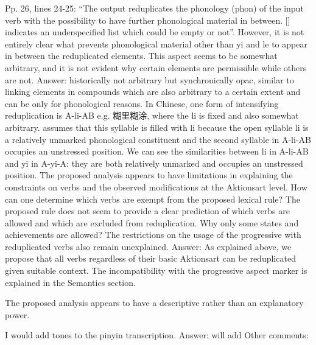 \documentclass[fleqn,twoside]{article}
\begin{document}
{%
Pp. 26, lines 24-25: “The output reduplicates the phonology (phon) of the input verb with the possibility to have further phonological material in between. [] indicates an underspecified list which could be empty or not”. However, it is not entirely clear what prevents phonological material other than yi and le to appear in between the reduplicated elements. This aspect seems to be somewhat arbitrary, and it is not evident why certain elements are permissible while others are not.
Answer:
historically not arbitrary but synchronically opac, similar to linking elements in compounds which are also arbitrary to a certain extent and can be only for phonological reasons.
In Chinese, one form of intensifying reduplication is A-li-AB e.g. 糊里糊涂, where the li is fixed and also somewhat arbitrary. 
\citet[137]{Sui2018} assumes that this syllable is filled with li because the open syllable li is a relatively unmarked phonological constituent \citep{Yip1992}
and the second syllable in A-li-AB occupies an unstressed position. 
We can see the similarities between li in A-li-AB and yi in A-yi-A: they are both relatively unmarked and occupies an unstressed position.
The proposed analysis appears to have limitations in explaining the constraints on verbs and the observed modifications at the Aktionsart level. How can one determine which verbs are exempt from the proposed lexical rule? The proposed rule does not seem to provide a clear prediction of which verbs are allowed and which are excluded from reduplication. Why only some states and achievements are allowed? The restrictions on the usage of the progressive with reduplicated verbs also remain unexplained.
Answer:
As explained above, we propose that all verbs regardless of their basic Aktionsart can be reduplicated given suitable context.
The incompatibility with the progressive aspect marker is explained in the Semantics section.

The proposed analysis appears to have a descriptive rather than an explanatory power.

I would add tones to the pinyin transcription.
Answer: will add
Other comments:

}
\end{document}
